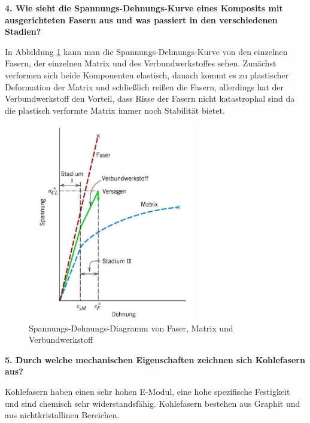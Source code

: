 \noindent\textbf{4. Wie sieht die Spannungs-Dehnungs-Kurve eines Komposits mit ausgerichteten Fasern aus und was passiert in den verschiedenen Stadien?}\\
\begin{addmargin}[25pt]{0pt}
In Abbildung \ref{fig:Faser_Spannung_Dehnung} kann man die Spannungs-Dehnungs-Kurve von den einzelnen Fasern, der einzelnen Matrix und des Verbundwerkstoffes sehen. Zunächst verformen sich beide Komponenten elastisch, danach kommt es zu plastischer Deformation der Matrix und schließlich reißen die Fasern, allerdings hat der Verbundwerkstoff den Vorteil, dass Risse der Fasern nicht katastrophal sind da die plastisch verformte Matrix immer noch Stabilität bietet.  \\ 
\begin{figure}[h]
    \centering
    \includegraphics[width = 0.65\textwidth]{images/Materialwissenschaften/Faser_spannung-Dehnung.png}
    \caption{Spannungs-Dehnungs-Diagramm von Faser, Matrix und Verbundwerkstoff}
    \label{fig:Faser_Spannung_Dehnung}
\end{figure}
\end{addmargin}

\noindent\textbf{5. Durch welche mechanischen Eigenschaften zeichnen sich Kohlefasern aus?}\\
\begin{addmargin}[25pt]{0pt}
Kohlefasern haben einen sehr hohen E-Modul, eine hohe spezifische Festigkeit und sind chemisch sehr widerstandsfähig. Kohlefasern bestehen aus Graphit und aus nichtkristallinen Bereichen. \\
\end{addmargin}

